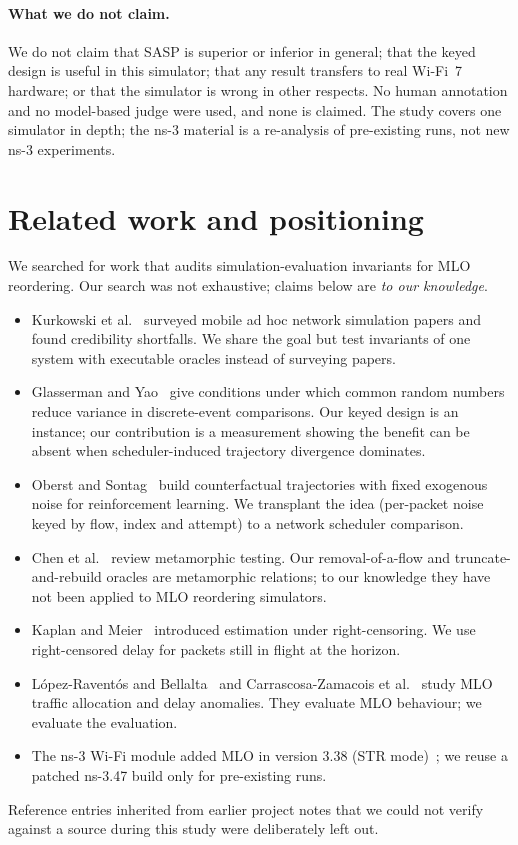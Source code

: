 \documentclass[11pt]{article}
\begin{document}
\paragraph{What we do not claim.} We do not claim that SASP is superior or inferior in general; that the keyed design is useful in this simulator; that any result transfers to real Wi-Fi~7 hardware; or that the simulator is wrong in other respects.
No human annotation and no model-based judge were used, and none is claimed.
The study covers one simulator in depth; the ns-3 material is a re-analysis of pre-existing runs, not new ns-3 experiments.

\section{Related work and positioning}
We searched for work that audits simulation-evaluation invariants for MLO reordering. Our search was not exhaustive; claims below are \emph{to our knowledge}.
\begin{itemize}
  \item Kurkowski et al.~\cite{kurkowski2005manet} surveyed mobile ad hoc network simulation papers and found credibility shortfalls. We share the goal but test invariants of one system with executable oracles instead of surveying papers.
  \item Glasserman and Yao~\cite{glasserman1992crn} give conditions under which common random numbers reduce variance in discrete-event comparisons. Our keyed design is an instance; our contribution is a measurement showing the benefit can be absent when scheduler-induced trajectory divergence dominates.
  \item Oberst and Sontag~\cite{oberst2019counterfactual} build counterfactual trajectories with fixed exogenous noise for reinforcement learning. We transplant the idea (per-packet noise keyed by flow, index and attempt) to a network scheduler comparison.
  \item Chen et al.~\cite{chen2018metamorphic} review metamorphic testing. Our removal-of-a-flow and truncate-and-rebuild oracles are metamorphic relations; to our knowledge they have not been applied to MLO reordering simulators.
  \item Kaplan and Meier~\cite{kaplan1958nonparametric} introduced estimation under right-censoring. We use right-censored delay for packets still in flight at the horizon.
  \item L{\'o}pez-Ravent{\'o}s and Bellalta~\cite{lopezraventos2022mlo} and Carrascosa-Zamacois et al.~\cite{carrascosa2023understanding} study MLO traffic allocation and delay anomalies. They evaluate MLO behaviour; we evaluate the evaluation.
  \item The ns-3 Wi-Fi module added MLO in version 3.38 (STR mode)~\cite{ns3wifi2024}; we reuse a patched ns-3.47 build only for pre-existing runs.
\end{itemize}
Reference entries inherited from earlier project notes that we could not verify against a source during this study were deliberately left out.
\end{document}

